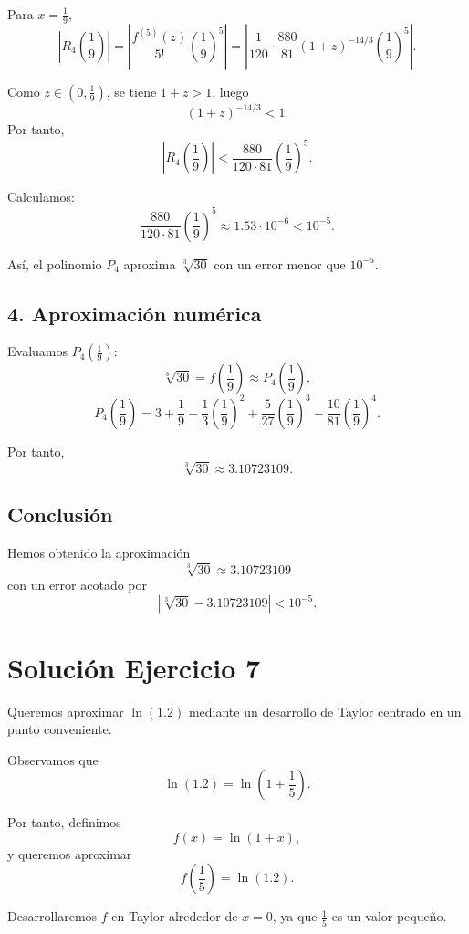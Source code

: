 \documentclass[12pt]{article}
\begin{document}
Para \(x=\frac{1}{9}\),
\[
\left|R_4\!\left(\frac{1}{9}\right)\right|
=
\left|
\frac{f^{(5)}(z)}{5!}\left(\frac{1}{9}\right)^5
\right|
=
\left|
\frac{1}{120}\cdot \frac{880}{81}(1+z)^{-14/3}\left(\frac{1}{9}\right)^5
\right|.
\]

Como \(z\in\left(0,\frac{1}{9}\right)\), se tiene \(1+z>1\), luego
\[
(1+z)^{-14/3}<1.
\]
Por tanto,
\[
\left|R_4\!\left(\frac{1}{9}\right)\right|
<
\frac{880}{120\cdot 81}\left(\frac{1}{9}\right)^5.
\]

Calculamos:
\[
\frac{880}{120\cdot 81}\left(\frac{1}{9}\right)^5
\approx 1.53\cdot 10^{-6}<10^{-5}.
\]

Así, el polinomio \(P_4\) aproxima \(\sqrt[3]{30}\) con un error menor que \(10^{-5}\).

\subsection*{4. Aproximación numérica}

Evaluamos \(P_4\left(\frac{1}{9}\right)\):
\[
\sqrt[3]{30}=f\left(\frac{1}{9}\right)\approx P_4\left(\frac{1}{9}\right),
\]
\[
P_4\left(\frac{1}{9}\right)
=
3+\frac{1}{9}-\frac{1}{3}\left(\frac{1}{9}\right)^2+\frac{5}{27}\left(\frac{1}{9}\right)^3-\frac{10}{81}\left(\frac{1}{9}\right)^4.
\]

Por tanto,
\[
\sqrt[3]{30}\approx 3.10723109.
\]

\subsection*{Conclusión}

Hemos obtenido la aproximación
\[
\boxed{\sqrt[3]{30}\approx 3.10723109}
\]
con un error acotado por
\[
\left|\sqrt[3]{30}-3.10723109\right|<10^{-5}.
\]

\section*{Solución Ejercicio 7}

Queremos aproximar \(\ln(1.2)\) mediante un desarrollo de Taylor centrado en un punto conveniente.

Observamos que
\[
\ln(1.2)=\ln\left(1+\frac{1}{5}\right).
\]

Por tanto, definimos
\[
f(x)=\ln(1+x),
\]
y queremos aproximar
\[
f\left(\frac{1}{5}\right)=\ln(1.2).
\]

Desarrollaremos \(f\) en Taylor alrededor de \(x=0\), ya que \(\frac{1}{5}\) es un valor pequeño.
\end{document}
